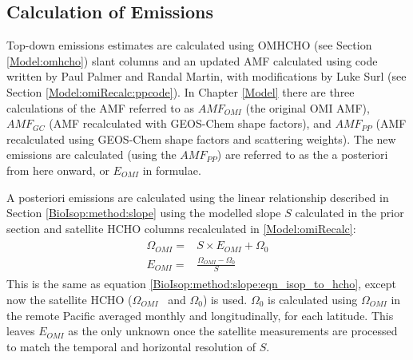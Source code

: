 \documentclass[acp, manuscript]{copernicus}
\newcommand{\parencite}{\citep}
\newcommand{\Oomi}{\Omega_{OMI}} %
\newcommand{\apost}{E_{OMI}} %
\begin{document}
    
  \subsection{Calculation of Emissions}
    \label{BioIsop:method:calculation}
   
    Top-down emissions estimates are calculated using OMHCHO (see Section \ref{Model:omhcho}) slant columns and an updated AMF calculated using code written by Paul Palmer and Randal Martin, with modifications by Luke Surl (see Section \ref{Model:omiRecalc:ppcode}).
    In Chapter \ref{Model} there are three calculations of the AMF referred to as $AMF_{OMI}$ (the original OMI AMF), $AMF_{GC}$ (AMF recalculated with GEOS-Chem shape factors), and $AMF_{PP}$ (AMF recalculated using GEOS-Chem shape factors and scattering weights).
    The new emissions are calculated (using the $AMF_{PP}$) are referred to as the a posteriori from here onward, or $\apost$ in formulae.
    
    
    A posteriori emissions are calculated using the linear relationship described in Section \ref{BioIsop:method:slope} using the modelled slope $S$ calculated in the prior section and satellite HCHO columns recalculated in \ref{Model:omiRecalc}:
    \begin{eqnarray} \begin{split}
      \label{BioIsop:method:eqn_Enew}
      \Oomi = & S \times \apost + \Omega_0 \\
      \apost = & \frac{\Oomi - \Omega_{0}}{S}
    \end{split} \end{eqnarray} 
    This is the same as equation \ref{BioIsop:method:slope:eqn_isop_to_hcho}, except now the satellite HCHO ($\Oomi$ ~and $\Omega_0$) is used.
    $\Omega_0$ is calculated using $\Oomi$ in the remote Pacific averaged monthly and longitudinally, for each latitude.
    This leaves $\apost$ as the only unknown once the satellite measurements are processed to match the temporal and horizontal resolution of $S$.
    
\end{document}
